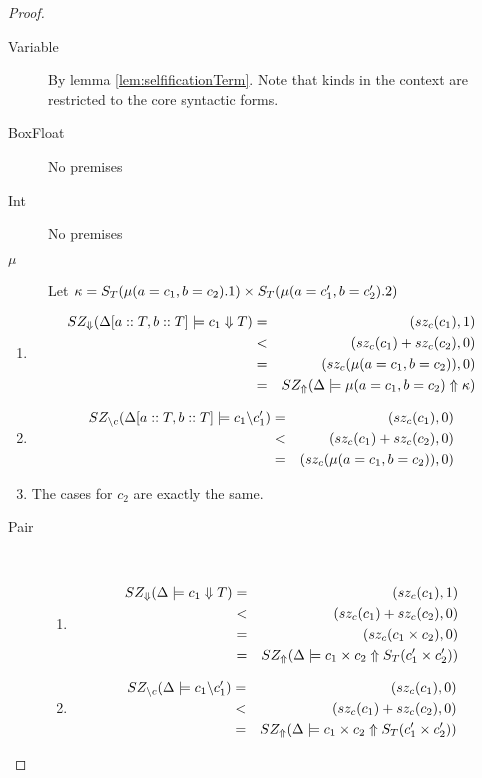 \documentclass[12pt,twoside,fleqn]{amsart}
\theoremstyle{plain}
\theoremstyle{plain}
\theoremstyle{definition}
\begin{document}
\begin{proof}
\begin{itemize}
\begin{description}
\item [Variable]By lemma \ref{lem:selfificationTerm}. Note that kinds in the context
are restricted to the core syntactic forms.
\item [BoxFloat]No premises
\item [Int]No premises
\item [\( \mu  \)]Let \( \kappa =S_{T}(\mu (a=c_{1},b=c_{2}).1 )\times S_{T}(\mu (a=c_{1}',b=c_{2}').2 ) \)
\end{description}
\begin{enumerate}
\item 
\begin{eqnarray*}
SZ_{\Downarrow }(\Delta [a::T,b::T]  \models c_{1}  \Downarrow T  ) & = & (sz_{c}(c_{1} ),1)\\
 & < & (sz_{c}(c_{1} )+sz_{c}(c_{2} ),0)\\
 & = & (sz_{c}(\mu (a=c_{1},b=c_{2}) ),0)\\
 & = & SZ_{\Uparrow }(\Delta  \models \mu (a=c_{1},b=c_{2}) \Uparrow \kappa  )
\end{eqnarray*}

\item 
\begin{eqnarray*}
SZ_{\backslash c}(\Delta [a::T,b::T]  \models c_{1}  \backslash c_{1}'  ) & = & (sz_{c}(c_{1} ),0)\\
 & < & (sz_{c}(c_{1} )+sz_{c}(c_{2} ),0)\\
 & = & (sz_{c}(\mu (a=c_{1},b=c_{2}) ),0)
\end{eqnarray*}
 
\item The cases for \( c_{2} \) are exactly the same.
\end{enumerate}
\begin{description}
\item [Pair]~

\begin{enumerate}
\item 
\begin{eqnarray*}
SZ_{\Downarrow }(\Delta  \models c_{1} \Downarrow T ) & = & (sz_{c}(c_{1} ),1)\\
 & < & (sz_{c}(c_{1} )+sz_{c}(c_{2} ),0)\\
 & = & (sz_{c}(c_{1}\times c_{2} ),0)\\
 & = & SZ_{\Uparrow }(\Delta  \models c_{1}\times c_{2} \Uparrow S_{T}(c_{1}'\times c_{2}' ) )
\end{eqnarray*}

\item 
\begin{eqnarray*}
SZ_{\backslash c}(\Delta   \models c_{1}  \backslash c_{1}'  ) & = & (sz_{c}(c_{1} ),0)\\
 & < & (sz_{c}(c_{1} )+sz_{c}(c_{2} ),0)\\
 & = & SZ_{\Uparrow }(\Delta   \models c_{1}\times c_{2}  \Uparrow S_{T}(c_{1}'\times c_{2}' )  )
\end{eqnarray*}


\end{enumerate}
\end{description}
\end{itemize}
\end{proof}
\end{document}
